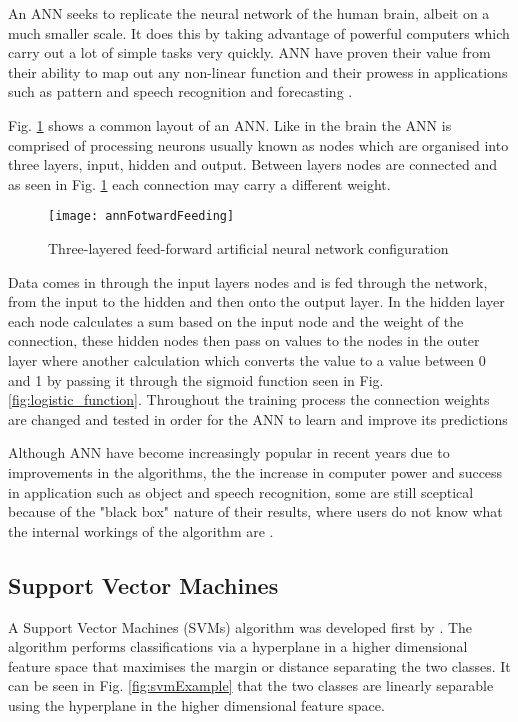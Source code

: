 An ANN seeks to replicate the neural network of the human brain, albeit on a much smaller scale. It does this by taking advantage of powerful computers which carry out a lot of simple tasks very quickly. ANN have proven their value from their ability to map out any non-linear function \citep{white_learning_1989} and their prowess in applications such as pattern and speech recognition and forecasting \citep{kaastra_forecasting_1995}.

Fig. \ref{fig:annFotwardFeeding} shows a common layout of an ANN. Like in the brain the ANN is comprised of processing neurons usually known as nodes which are organised into three layers, input, hidden and output. Between layers nodes are connected and as seen in Fig. \ref{fig:annFotwardFeeding} each connection may carry a different weight.

\begin{figure}[H]
	\texttt{[image: annFotwardFeeding]}
	\caption{Three-layered feed-forward artificial neural network configuration \\
				\cite[Source:][]{raju_development_2011}
			}
	\label{fig:annFotwardFeeding}
\end{figure}

Data comes in through the input layers nodes and is fed through the network, from the input to the hidden and then onto the output layer. In the hidden layer each node calculates a sum based on the input node and the weight of the connection, these hidden nodes then pass on values to the nodes in the outer layer where another calculation which converts the value to a value between 0 and 1 by passing it through the sigmoid function seen in Fig. \ref{fig:logistic_function}. Throughout the training process the connection weights are changed and tested in order for the ANN to learn and improve its predictions \citep{haykin_neural_1998}

Although ANN have become increasingly popular in recent years due to improvements in the algorithms, the the increase in computer power and success in application such as object and speech recognition,  some are still sceptical because of the "black box" nature of their results, where users do not know what the internal workings of the algorithm are  \citep{kaastra_forecasting_1995}. 



\subsection{Support Vector Machines} \label{SVM}
A Support Vector Machines (SVMs) algorithm was developed first by \cite{vapnik_nature_1995}. The algorithm performs classifications via a hyperplane in a higher dimensional feature space that maximises the margin or distance separating the two classes. It can be seen in Fig. \ref{fig:svmExample} that the two classes are linearly separable using the hyperplane in the higher dimensional feature space. 

